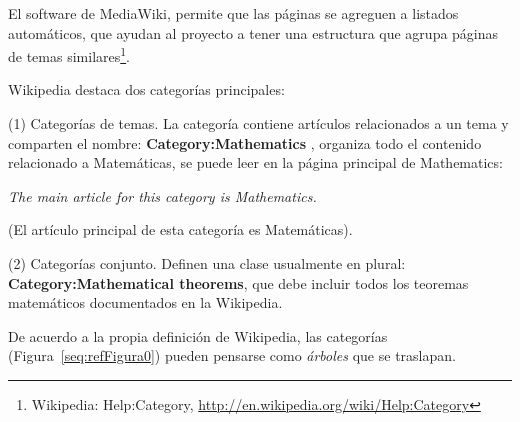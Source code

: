 \documentclass[letterpaper]{article}
\newcounter{Figura}
\begin{document}
\bigskip

{\sffamily
El software de MediaWiki, permite que las p\'aginas se agreguen a
listados autom\'aticos, que ayudan al proyecto a tener una estructura
que agrupa p\'aginas de temas similares\footnote{Wikipedia:
Help:Category, \url{http://en.wikipedia.org/wiki/Help:Category}}.}


\bigskip

{\sffamily
Wikipedia destaca dos categor\'ias principales:}


\bigskip

{\sffamily
(1) Categor\'ias de temas. La categor\'ia contiene art\'iculos
relacionados a un tema y comparten el nombre:
\textbf{Category:Mathematics} , organiza todo el contenido relacionado
a Matem\'aticas, se puede leer en la p\'agina principal de
Mathematics:}

{\centering{}\sffamily\itshape
The main article for this category is Mathematics.
\par}

{\centering{}\sffamily
(El art\'iculo principal de esta categor\'ia es Matem\'aticas).
\par}


\bigskip

{\sffamily
(2) Categor\'ias conjunto. Definen una clase usualmente en plural:
\textbf{Category:Mathematical theorems}, que debe incluir todos los
teoremas matem\'aticos documentados en la Wikipedia.}


\bigskip

{\sffamily
De acuerdo a la propia definici\'on de Wikipedia, las categor\'ias
(Figura~\ref{seq:refFigura0}) pueden pensarse como \textit{\'arboles}
que se traslapan.}


\bigskip
\end{document}
